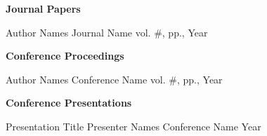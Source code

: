 
\setcounter{enumi}{0}

\textbf{Journal Papers}
\begin{enumerate}[resume]
    {}
    {Author Names}
    {Journal Name}
    {vol. \#, pp., Year}
\end{enumerate}

\textbf{Conference Proceedings}
\begin{enumerate}[resume]
    {}
    {Author Names}
    {Conference Name}
    {vol. \#, pp., Year}
\end{enumerate}

\textbf{Conference Presentations}
\begin{enumerate}[resume]
  \publication
    {Presentation Title}
    {}
    {Presenter Names}
    {Conference Name}
    {Year}
\end{enumerate}